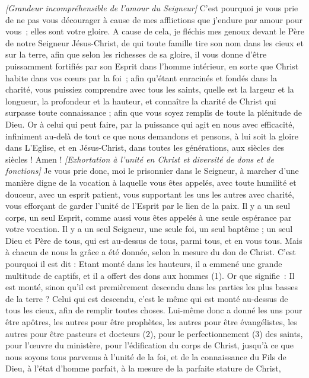 \begin{multicols}{2}
\textit{[Grandeur incompréhensible de l'amour du Seigneur]}
C'est pourquoi je vous prie de ne pas vous décourager à cause de mes afflictions que j’endure par amour pour vous ; elles sont votre gloire.
A cause de cela, je fléchis mes genoux devant le Père de notre Seigneur Jésus-Christ,
de qui toute famille tire son nom dans les cieux et sur la terre,
afin que selon les richesses de sa gloire, il vous donne d'être puissamment fortifiés par son Esprit dans l'homme intérieur,
en sorte que Christ habite dans vos cœurs par la foi ; afin qu’étant enracinés et fondés dans la charité,
vous puissiez comprendre avec tous les saints, quelle est la largeur et la longueur, la profondeur et la hauteur,
et connaître la charité de Christ qui surpasse toute connaissance ; afin que vous soyez remplis de toute la plénitude de Dieu.
Or à celui qui peut faire, par la puissance qui agit en nous avec efficacité, infiniment au-delà de tout ce que nous demandons et pensons,
à lui soit la gloire dans L’Eglise, et en Jésus-Christ, dans toutes les générations, aux siècles des siècles ! Amen !
\textit{[Exhortation à l'unité en Christ et diversité de dons et de fonctions]}
\VerseOne{}Je vous prie donc, moi le prisonnier dans le Seigneur, à marcher d'une manière digne de la vocation à laquelle vous êtes appelés,
avec toute humilité et douceur, avec un esprit patient, vous supportant les uns les autres avec charité,
vous efforçant de garder l'unité de l'Esprit par le lien de la paix.
Il y a un seul corps, un seul Esprit, comme aussi vous êtes appelés à une seule espérance par votre vocation.
Il y a un seul Seigneur, une seule foi, un seul baptême ;
un seul Dieu et Père de tous, qui est au-dessus de tous, parmi tous, et en vous tous.
Mais à chacun de nous la grâce a été donnée, selon la mesure du don de Christ.
C'est pourquoi il est dit : Etant monté dans les hauteurs, il a emmené une grande multitude de captifs, et il a offert des dons aux hommes (1).
Or que signifie : Il est monté, sinon qu’il est premièrement descendu dans les parties les plus basses de la terre ?
Celui qui est descendu, c'est le même qui est monté au-dessus de tous les cieux, afin de remplir toutes choses.
Lui-même donc a donné les uns pour être apôtres, les autres pour être prophètes, les autres pour être évangélistes, les autres pour être pasteurs et docteurs (2),
pour le perfectionnement (3) des saints, pour l’œuvre du ministère, pour l'édification du corps de Christ,
jusqu'à ce que nous soyons tous parvenus à l'unité de la foi, et de la connaissance du Fils de Dieu, à l'état d'homme parfait, à la mesure de la parfaite stature de Christ,

\end{multicols}

